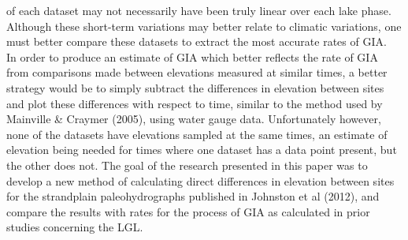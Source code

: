 \documentclass{article}
\begin{document}
 of each dataset may not necessarily have been truly linear over each lake phase.
 Although these short-term variations may better relate to climatic variations,
 one must better compare these datasets to extract the most accurate rates of GIA.
  \\
 In order to produce an estimate of GIA which better reflects the rate of GIA from
 comparisons made between elevations measured at similar times, a better strategy would be to simply subtract
 the differences in elevation between sites and plot these differences with
 respect to time, similar to the method used by Mainville \& Craymer (2005), using
 water gauge data. Unfortunately however, none of the datasets have elevations
 sampled at the same times, an estimate of elevation being needed for times where
 one dataset
 has a data point present, but the other does not. The goal of the research
 presented in this paper was to develop a new method of calculating direct differences
 in elevation between sites for the strandplain paleohydrographs published in
 Johnston et al (2012), and compare the results with rates for the process of GIA
 as calculated in prior studies concerning the LGL. \\

 
\end{document}
